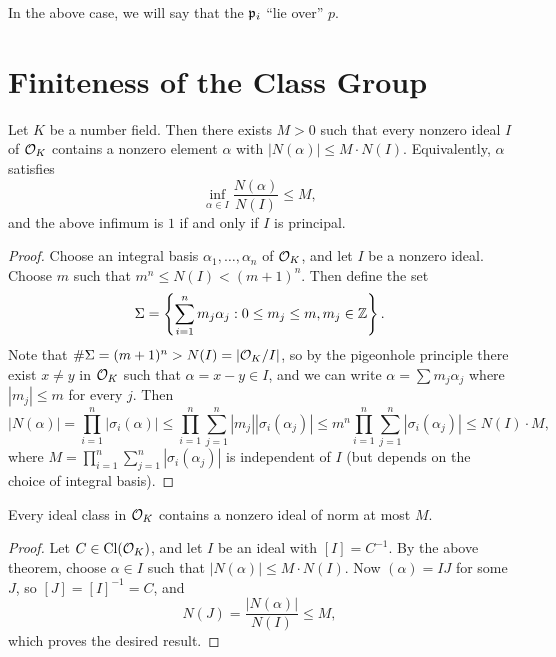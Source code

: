 \begin{remark}
  In the above case, we will say that the
  $\mathfrak{p}_i$ ``lie over'' $p$.
\end{remark}

\section{Finiteness of the Class Group}
\begin{theorem}
  Let $K$ be a number field. Then there exists $M > 0$
  such that every nonzero ideal $I$ of $\mathcal{O}_K$ contains
  a nonzero element $\alpha$ with
  $|N(\alpha)| \le M \cdot N(I)$. Equivalently,
  $\alpha$ satisfies
  \[
    \inf_{\alpha \in I} \frac{N(\alpha)}{N(I)} \le M,
  \]
  and the above infimum is $1$ if and only if $I$ is
  principal.
\end{theorem}

\begin{proof}
  Choose an integral basis $\alpha_1, \dots, \alpha_n$
  of $\mathcal{O}_K$, and let $I$ be a nonzero ideal.
  Choose $m$ such that $m^n \le N(I) < (m + 1)^n$.
  Then define the set
  \[
    \Sigma =
    \left\{
      \sum_{i = 1}^n m_j \alpha_j : 0 \le m_j \le m, m_j \in \mathbb{Z}
    \right\}.
  \]
  Note that $\# \Sigma = (m + 1)^n > N(I) = |\mathcal{O}_K / I|$,
  so by the pigeonhole principle there exist $x \ne y$
  in $\mathcal{O}_K$ such that $\alpha = x - y \in I$, and
  we can write $\alpha = \sum m_j \alpha_j$ where
  $|m_j| \le m$ for every $j$. Then
  \[
    |N(\alpha)| = \prod_{i = 1}^n |\sigma_i(\alpha)|
    \le \prod_{i = 1}^n \sum_{j = 1}^n |m_j| |\sigma_i(\alpha_j)|
    \le m^n \prod_{i = 1}^n \sum_{j = 1}^n |\sigma_i(\alpha_j)|
    \le N(I) \cdot M,
  \]
  where $M = \prod_{i = 1}^n \sum_{j = 1}^n |\sigma_i(\alpha_j)|$
  is independent of $I$ (but depends on the
  choice of integral basis).
\end{proof}

\begin{corollary}
  Every ideal class in $\mathcal{O}_K$ contains a nonzero
  ideal of norm at most $M$.
\end{corollary}

\begin{proof}
  Let $C \in \operatorname{Cl}(\mathcal{O}_K)$, and let $I$ be an ideal
  with $[I] = C^{-1}$. By the above theorem,
  choose $\alpha \in I$ such that $|N(\alpha)| \le M \cdot N(I)$.
  Now $(\alpha) = IJ$ for some $J$, so
  $[J] = [I]^{-1} = C$, and
  \[
    N(J) = \frac{|N(\alpha)|}{N(I)} \le M,
  \]
  which proves the desired result.
\end{proof}

